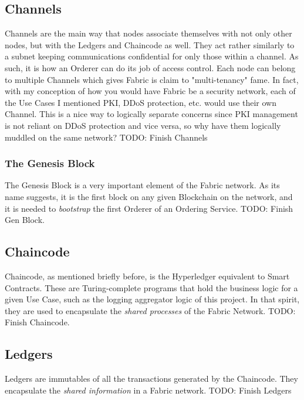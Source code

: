 	\subsection{Channels}
		\hspace{10mm} Channels are the main way that nodes associate themselves with not only other nodes, but with the Ledgers and Chaincode as well. They act rather similarly to a subnet keeping communications confidential for only those within a channel. As such, it is how an Orderer can do its job of access control. Each node can belong to multiple Channels which gives Fabric is claim to "multi-tenancy" fame. In fact, with my conception of how you would have Fabric be a security network, each of the Use Cases I mentioned PKI, DDoS protection, etc. would use their own Channel. This is a nice way to logically separate concerns since PKI management is not reliant on DDoS protection and vice versa, so why have them logically muddled on the same network? TODO: Finish Channels\\
		
		\subsubsection{The Genesis Block}
			\hspace{10mm}The Genesis Block is a very important element of the Fabric network. As its name suggests, it is the first block on any given Blockchain on the network, and it is needed to \textit{bootstrap} the first Orderer of an Ordering Service. TODO: Finish Gen Block. \\
			
	\subsection{Chaincode}
		\hspace{10mm}Chaincode, as mentioned briefly before, is the Hyperledger equivalent to Smart Contracts. These are Turing-complete programs that hold the business logic for a given Use Case, such as the logging aggregator logic of this project. In that spirit, they are used to encapsulate the \textit{shared processes} of the Fabric Network. TODO: Finish Chaincode.\\
		
	\subsection{Ledgers}
		\hspace{10mm}Ledgers are immutables of all the transactions generated by the Chaincode. They encapsulate the \textit{shared information} in a Fabric network. TODO: Finish Ledgers\\